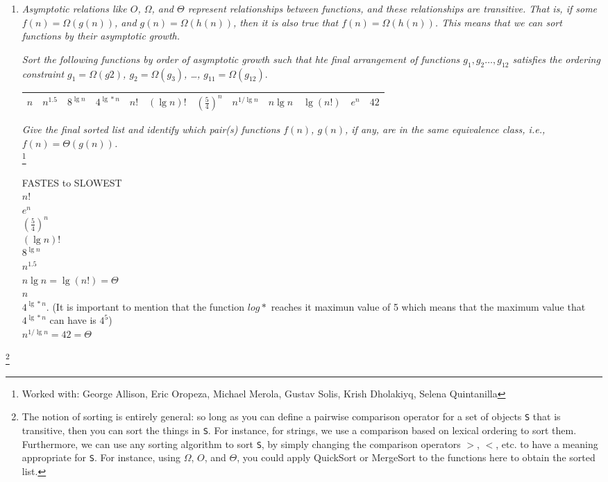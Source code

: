 \documentclass[12pt]{article} \setlength{\oddsidemargin}{0in}
\begin{document}
\begin{enumerate} [label=\textbf{\arabic*}.]
  \newpage
\item \textit{Asymptotic relations like $O$, $\Omega$, and $\Theta$ represent
    relationships between functions, and these relationships are
    transitive. That is, if some $f(n) = \Omega(g(n))$, and
    $g(n) = \Omega(h(n))$, then it is also true that
    $f(n) = \Omega(h(n))$. This means that we can sort functions by their
    asymptotic growth.} 

  \textit{Sort the following functions by order of asymptotic growth
    such that hte final arrangement of functions
    $g_1,g_2 \dots,g_{12}$ satisfies the ordering constraint
    $g_1 = \Omega(g2)$, $g_2 = \Omega(g_3)$, \dots , $g_{11}=\Omega(g_{12})$}.


  \begin{tabular}{|l|l|l|l|l|l|l|l|l|l|l|l|}
    \hline
    $n$ & $n^{1.5}$ & $8^{\lg n}$ & $4^{\lg* n}$ & $n!$ &$(\lg n)!$ & $(\frac{5}{4})^n$ & $n^{1/ \lg n}$ & $n \lg n$ & $\lg(n!)$ & $e^n$ & $42$ \\
    \hline
  \end{tabular}

  \textit{Give the final sorted list and identify which pair(s)
    functions $f(n)$, $g(n)$, if any, are in the same equivalence
    class, i.e., $f(n) = \Theta(g(n))$.} \\ \footnote{Worked with: George Allison, Eric Oropeza, Michael Merola, Gustav Solis, Krish Dholakiyq, Selena Quintanilla}


  FASTES to SLOWEST \\
  $n!$\\
  $e^n$\\
  $(\frac{5}{4})^n$\\
  $(\lg n)!$\\
   $8^{\lg n}$\\
    $n^{1.5}$\\
    $n \lg n = \lg(n!) = \Theta$\\
    $n$\\
    $4^{\lg* n}$.  (It is important to mention that the function $log*$ reaches it maximun value of 5 which means that the maximum value that $4^{\lg* n}$ can have is $4^5$)\\ 
    $n^{1/ \lg n} = 42 = \Theta$
    
    
  
  

\end{enumerate} 

\footnote{The notion of sorting is entirely general: so long as
  you can define a pairwise comparison operator for a set of objects
  \texttt{S} that is transitive, then you can sort the things in
  \texttt{S}. For instance, for strings, we use a comparison based on
  lexical ordering to sort them. Furthermore, we can use any sorting
  algorithm to sort \texttt{S}, by simply changing the comparison
  operators $>$, $<$, etc. to have a meaning appropriate for
  \texttt{S}. For instance, using $\Omega$, $O$, and $\Theta$, you could apply
  QuickSort or MergeSort to the functions here to obtain the sorted
  list.}
\end{document}
